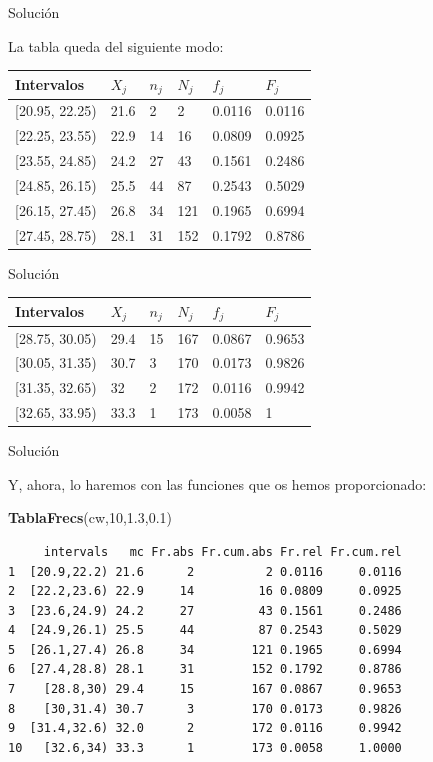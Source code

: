 \documentclass[
  ignorenonframetext,
]{beamer}
\newenvironment{Shaded}{\begin{snugshade}}{\end{snugshade}}
\newcommand{\DecValTok}[1]{\textcolor[rgb]{0.00,0.00,0.81}{#1}}
\newcommand{\FloatTok}[1]{\textcolor[rgb]{0.00,0.00,0.81}{#1}}
\newcommand{\KeywordTok}[1]{\textcolor[rgb]{0.13,0.29,0.53}{\textbf{#1}}}
\newcommand{\NormalTok}[1]{#1}
\begin{document}
\begin{frame}{Solución}
\protect\hypertarget{soluciuxf3n-11}{}

La tabla queda del siguiente modo:

\begin{longtable}[]{@{}llllll@{}}
\toprule
Intervalos & \(X_j\) & \(n_j\) & \(N_j\) & \(f_j\) &
\(F_j\)\tabularnewline
\midrule
\endhead
{[}20.95, 22.25) & 21.6 & 2 & 2 & 0.0116 & 0.0116\tabularnewline
{[}22.25, 23.55) & 22.9 & 14 & 16 & 0.0809 & 0.0925\tabularnewline
{[}23.55, 24.85) & 24.2 & 27 & 43 & 0.1561 & 0.2486\tabularnewline
{[}24.85, 26.15) & 25.5 & 44 & 87 & 0.2543 & 0.5029\tabularnewline
{[}26.15, 27.45) & 26.8 & 34 & 121 & 0.1965 & 0.6994\tabularnewline
{[}27.45, 28.75) & 28.1 & 31 & 152 & 0.1792 & 0.8786\tabularnewline
\bottomrule
\end{longtable}

\end{frame}

\begin{frame}{Solución}
\protect\hypertarget{soluciuxf3n-12}{}

\begin{longtable}[]{@{}llllll@{}}
\toprule
Intervalos & \(X_j\) & \(n_j\) & \(N_j\) & \(f_j\) &
\(F_j\)\tabularnewline
\midrule
\endhead
{[}28.75, 30.05) & 29.4 & 15 & 167 & 0.0867 & 0.9653\tabularnewline
{[}30.05, 31.35) & 30.7 & 3 & 170 & 0.0173 & 0.9826\tabularnewline
{[}31.35, 32.65) & 32 & 2 & 172 & 0.0116 & 0.9942\tabularnewline
{[}32.65, 33.95) & 33.3 & 1 & 173 & 0.0058 & 1\tabularnewline
\bottomrule
\end{longtable}

\end{frame}

\begin{frame}[fragile]{Solución}
\protect\hypertarget{soluciuxf3n-13}{}

Y, ahora, lo haremos con las funciones que os hemos proporcionado:

\begin{Shaded}
\begin{Highlighting}[]
\KeywordTok{TablaFrecs}\NormalTok{(cw,}\DecValTok{10}\NormalTok{,}\FloatTok{1.3}\NormalTok{,}\FloatTok{0.1}\NormalTok{)}
\end{Highlighting}
\end{Shaded}

\begin{verbatim}
     intervals   mc Fr.abs Fr.cum.abs Fr.rel Fr.cum.rel
1  [20.9,22.2) 21.6      2          2 0.0116     0.0116
2  [22.2,23.6) 22.9     14         16 0.0809     0.0925
3  [23.6,24.9) 24.2     27         43 0.1561     0.2486
4  [24.9,26.1) 25.5     44         87 0.2543     0.5029
5  [26.1,27.4) 26.8     34        121 0.1965     0.6994
6  [27.4,28.8) 28.1     31        152 0.1792     0.8786
7    [28.8,30) 29.4     15        167 0.0867     0.9653
8    [30,31.4) 30.7      3        170 0.0173     0.9826
9  [31.4,32.6) 32.0      2        172 0.0116     0.9942
10   [32.6,34) 33.3      1        173 0.0058     1.0000
\end{verbatim}

\end{frame}
\end{document}
